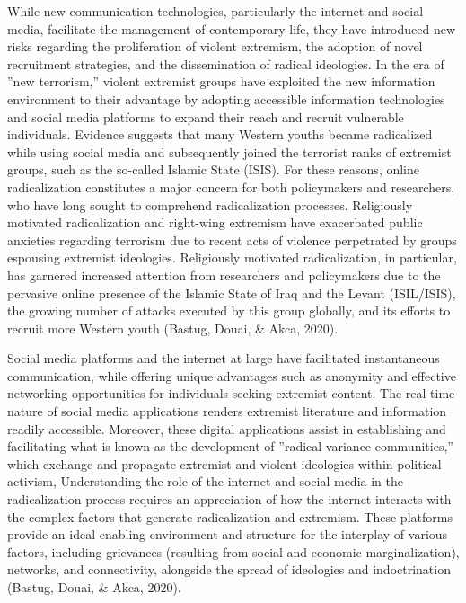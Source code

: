 \documentclass[11pt,a4paper]{article}
\begin{document}
	While new communication technologies, particularly the internet and social media, facilitate the management of contemporary life, they have introduced new risks regarding the proliferation of violent extremism, the adoption of novel recruitment strategies, and the dissemination of radical ideologies. In the era of ''new terrorism,'' violent extremist groups have exploited the new information environment to their advantage by adopting accessible information technologies and social media platforms to expand their reach and recruit vulnerable individuals. Evidence suggests that many Western youths became radicalized while using social media and subsequently joined the terrorist ranks of extremist groups, such as the so-called Islamic State (ISIS). For these reasons, online radicalization constitutes a major concern for both policymakers and researchers, who have long sought to comprehend radicalization processes. Religiously motivated radicalization and right-wing extremism have exacerbated public anxieties regarding terrorism due to recent acts of violence perpetrated by groups espousing extremist ideologies. Religiously motivated radicalization, in particular, has garnered increased attention from researchers and policymakers due to the pervasive online presence of the Islamic State of Iraq and the Levant (ISIL/ISIS), the growing number of attacks executed by this group globally, and its efforts to recruit more Western youth (Bastug, Douai, \& Akca, 2020).
	
	Social media platforms and the internet at large have facilitated instantaneous communication, while offering unique advantages such as anonymity and effective networking opportunities for individuals seeking extremist content. The real-time nature of social media applications renders extremist literature and information readily accessible. Moreover, these digital applications assist in establishing and facilitating what is known as the development of ''radical variance communities,'' which exchange and propagate extremist and violent ideologies within political activism, Understanding the role of the internet and social media in the radicalization process requires an appreciation of how the internet interacts with the complex factors that generate radicalization and extremism. These platforms provide an ideal enabling environment and structure for the interplay of various factors, including grievances (resulting from social and economic marginalization), networks, and connectivity, alongside the spread of ideologies and indoctrination (Bastug, Douai, \& Akca, 2020).
	
\end{document}
